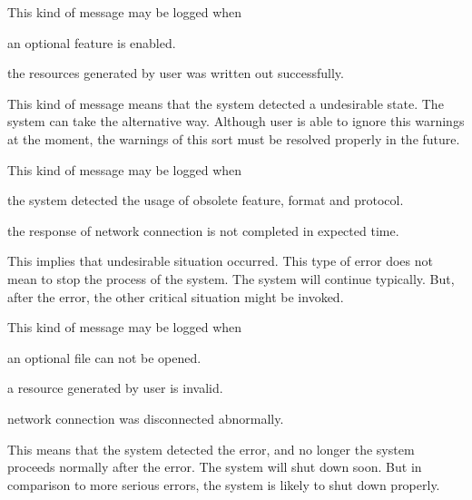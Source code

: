 \begin{Desc}
\begin{description}
This kind of message may be logged when
\begin{DoxyItemize}
\item an optional feature is enabled.
\item the resources generated by user was written out successfully. 
\end{DoxyItemize}\item[{\em 
\hypertarget{classhryky_1_1log_1_1_level_a9e6bba8f272859b212f49e4478a863d7a495a85e2f2bc926a2b27e55522b165fa}{warning\-\_\-}\label{classhryky_1_1log_1_1_level_a9e6bba8f272859b212f49e4478a863d7a495a85e2f2bc926a2b27e55522b165fa}
}]This kind of message means that the system detected a undesirable state. The system can take the alternative way. Although user is able to ignore this warnings at the moment, the warnings of this sort must be resolved properly in the future.

This kind of message may be logged when
\begin{DoxyItemize}
\item the system detected the usage of obsolete feature, format and protocol.
\item the response of network connection is not completed in expected time. 
\end{DoxyItemize}\item[{\em 
\hypertarget{classhryky_1_1log_1_1_level_a9e6bba8f272859b212f49e4478a863d7a40b4bfcc7ad7c7cc81b208d017d73cf3}{err\-\_\-}\label{classhryky_1_1log_1_1_level_a9e6bba8f272859b212f49e4478a863d7a40b4bfcc7ad7c7cc81b208d017d73cf3}
}]This implies that undesirable situation occurred. This type of error does not mean to stop the process of the system. The system will continue typically. But, after the error, the other critical situation might be invoked.

This kind of message may be logged when
\begin{DoxyItemize}
\item an optional file can not be opened.
\item a resource generated by user is invalid.
\item network connection was disconnected abnormally. 
\end{DoxyItemize}\item[{\em 
\hypertarget{classhryky_1_1log_1_1_level_a9e6bba8f272859b212f49e4478a863d7a1aee1f138c8b27174506f680faaaa177}{crit\-\_\-}\label{classhryky_1_1log_1_1_level_a9e6bba8f272859b212f49e4478a863d7a1aee1f138c8b27174506f680faaaa177}
}]This means that the system detected the error, and no longer the system proceeds normally after the error. The system will shut down soon. But in comparison to more serious errors, the system is likely to shut down properly.


\end{description}
\end{Desc}
